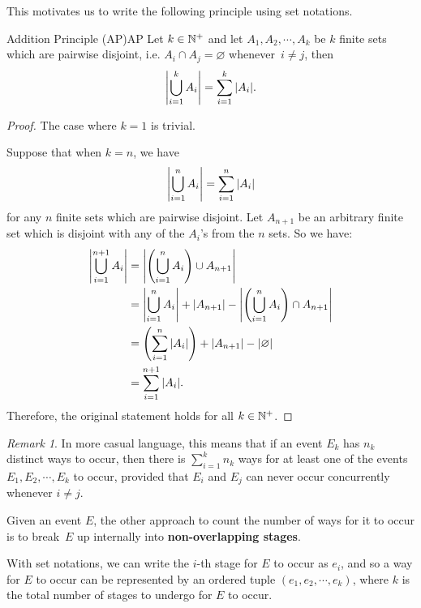 \documentclass[math]{amznotes}
\theoremstyle{remark}
\newtheorem*{remark}{Remark}
\begin{document}
This motivates us to write the following principle using set notations.
\begin{thmbox}{Addition Principle (AP)}{AP}
    Let $k \in \mathbb{N}^+$ and let $A_1, A_2, \cdots, A_k$ be $k$ finite sets which are pairwise disjoint, i.e. $A_i \cap A_j = \varnothing$ whenever~$i \neq j$, then
   \begin{equation*}
        {\left\lvert {\bigcup_{i = 1}^k A_i} \right\rvert} = \sum_{i = 1}^{k}{\left\lvert {A_i} \right\rvert}.
   \end{equation*} 
   \tcblower
   \begin{proof}
        The case where $k = 1$ is trivial.

        Suppose that when $k = n$, we have
        \begin{equation*}
            {\left\lvert {\bigcup_{i = 1}^n A_i} \right\rvert} = \sum_{i = 1}^{n}{\left\lvert {A_i} \right\rvert}
        \end{equation*} 
        for any $n$ finite sets which are pairwise disjoint. Let $A_{n + 1}$ be an arbitrary finite set which is disjoint with any of the $A_i$'s from the $n$ sets. So we have:
        \begin{align*}
            {\left\lvert {\bigcup_{i = 1}^{n + 1} A_i} \right\rvert} & = {\left\lvert {\left(\bigcup_{i = 1}^n A_i\right) \cup A_{n + 1}} \right\rvert} \\
            & = {\left\lvert {\bigcup_{i = 1}^n A_i} \right\rvert} + {\left\lvert {A_{n + 1}} \right\rvert} - {\left\lvert {\left(\bigcup_{i = 1}^n A_i\right) \cap A_{n + 1}} \right\rvert} \\
            & = \left(\sum_{i = 1}^{n}{\left\lvert {A_i} \right\rvert}\right) + {\left\lvert {A_{n + 1}} \right\rvert} - {\left\lvert {\varnothing} \right\rvert} \\
            & = \sum_{i = 1}^{n + 1}{\left\lvert {A_i} \right\rvert}.
        \end{align*}
        Therefore, the original statement holds for all $k \in \mathbb{N}^+$.
   \end{proof}
\end{thmbox}
\begin{notebox}
    \begin{remark}
        In more casual language, this means that if an event $E_k$ has $n_k$ distinct ways to occur, then there is $\sum_{i = 1}^{k}n_k$ ways for at least one of the events $E_1, E_2, \cdots, E_k$ to occur, provided that $E_i$ and $E_j$ can never occur concurrently whenever $i \neq j$.
    \end{remark}
\end{notebox}
Given an event $E$, the other approach to count the number of ways for it to occur is to break~$E$ up internally into \textbf{non-overlapping stages}.

With set notations, we can write the $i$-th stage for $E$ to occur as $e_i$, and so a way for $E$ to occur can be represented by an ordered tuple $(e_1, e_2, \cdots, e_k)$, where $k$ is the total number of stages to undergo for $E$ to occur.
\end{document}
